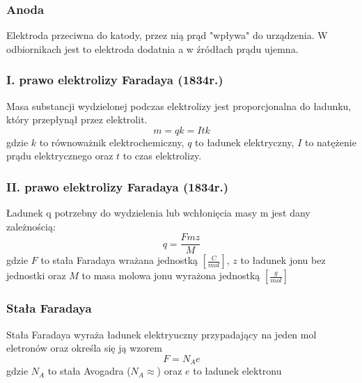 \documentclass[a4paper,12pts]{article}
\begin{document}
			\subsubsection{Anoda}
			Elektroda przeciwna do katody, przez nią prąd "wpływa" do urządzenia. W odbiornikach jest to elektroda dodatnia a w źródłach prądu ujemna.
			
			\subsubsection{I. prawo elektrolizy Faradaya (1834r.)}
			Masa substancji wydzielonej podczas elektrolizy jest proporcjonalna do ładunku, który przepłynął przez elektrolit.
			\begin{equation}
				m = qk = Itk
			\end{equation}
			gdzie $k$ to równoważnik elektrochemiczny, $q$ to ładunek elektryczny, $I$ to natężenie prądu elektrycznego oraz $t$ to czas elektrolizy.
			
			\subsubsection{II. prawo elektrolizy Faradaya (1834r.)}
			Ładunek q potrzebny do wydzielenia lub wchłonięcia masy m jest dany zależnością:
			\begin{equation}
				q = \frac{Fmz}{M}
			\end{equation}
			gdzie $F$ to stała Faradaya wrażana jednostką $\left[\frac{C}{mol}\right]$, $z$ to ładunek jonu bez jednostki oraz $M$ to masa molowa jonu wyrażona jednostką $\left[\frac{g}{mol}\right]$
			
			\subsubsection{Stała Faradaya}
			Stała Faradaya wyraża ładunek elektryuczny przypadający na jeden mol eletronów oraz określa się ją wzorem
			\begin{equation}
				F = N_A e
			\end{equation}
			gdzie $N_A$ to stała Avogadra ($N_A \approx $) oraz $e$ to ładunek elektronu		
	
	
	
	
	
\end{document}
